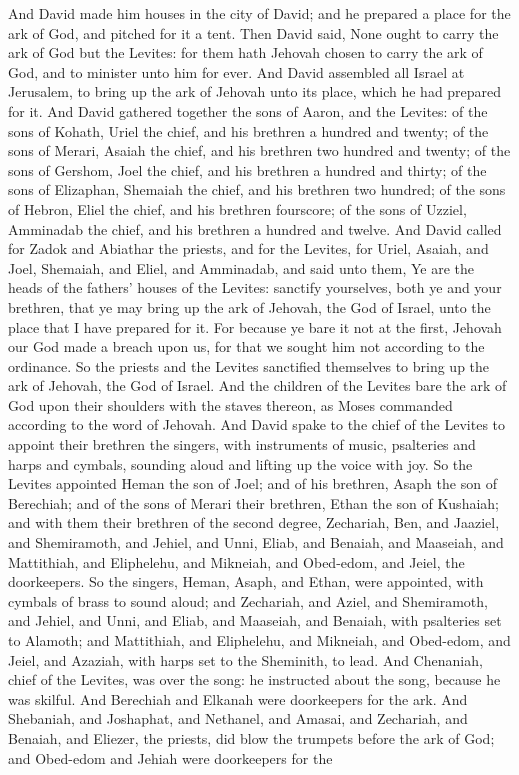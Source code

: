 And David made him houses in the city of David; and he prepared a place for the ark of God, and pitched for it a tent. Then David said, None ought to carry the ark of God but the Levites: for them hath Jehovah chosen to carry the ark of God, and to minister unto him for ever. And David assembled all Israel at Jerusalem, to bring up the ark of Jehovah unto its place, which he had prepared for it. And David gathered together the sons of Aaron, and the Levites: of the sons of Kohath, Uriel the chief, and his brethren a hundred and twenty; of the sons of Merari, Asaiah the chief, and his brethren two hundred and twenty; of the sons of Gershom, Joel the chief, and his brethren a hundred and thirty; of the sons of Elizaphan, Shemaiah the chief, and his brethren two hundred; of the sons of Hebron, Eliel the chief, and his brethren fourscore; of the sons of Uzziel, Amminadab the chief, and his brethren a hundred and twelve. And David called for Zadok and Abiathar the priests, and for the Levites, for Uriel, Asaiah, and Joel, Shemaiah, and Eliel, and Amminadab, and said unto them, Ye are the heads of the fathers’ houses of the Levites: sanctify yourselves, both ye and your brethren, that ye may bring up the ark of Jehovah, the God of Israel, unto the place that I have prepared for it. For because ye bare it not at the first, Jehovah our God made a breach upon us, for that we sought him not according to the ordinance. So the priests and the Levites sanctified themselves to bring up the ark of Jehovah, the God of Israel. And the children of the Levites bare the ark of God upon their shoulders with the staves thereon, as Moses commanded according to the word of Jehovah.  And David spake to the chief of the Levites to appoint their brethren the singers, with instruments of music, psalteries and harps and cymbals, sounding aloud and lifting up the voice with joy. So the Levites appointed Heman the son of Joel; and of his brethren, Asaph the son of Berechiah; and of the sons of Merari their brethren, Ethan the son of Kushaiah; and with them their brethren of the second degree, Zechariah, Ben, and Jaaziel, and Shemiramoth, and Jehiel, and Unni, Eliab, and Benaiah, and Maaseiah, and Mattithiah, and Eliphelehu, and Mikneiah, and Obed-edom, and Jeiel, the doorkeepers. So the singers, Heman, Asaph, and Ethan, were appointed, with cymbals of brass to sound aloud; and Zechariah, and Aziel, and Shemiramoth, and Jehiel, and Unni, and Eliab, and Maaseiah, and Benaiah, with psalteries set to Alamoth; and Mattithiah, and Eliphelehu, and Mikneiah, and Obed-edom, and Jeiel, and Azaziah, with harps set to the Sheminith, to lead. And Chenaniah, chief of the Levites, was over the song: he instructed about the song, because he was skilful. And Berechiah and Elkanah were doorkeepers for the ark. And Shebaniah, and Joshaphat, and Nethanel, and Amasai, and Zechariah, and Benaiah, and Eliezer, the priests, did blow the trumpets before the ark of God; and Obed-edom and Jehiah were doorkeepers for the 